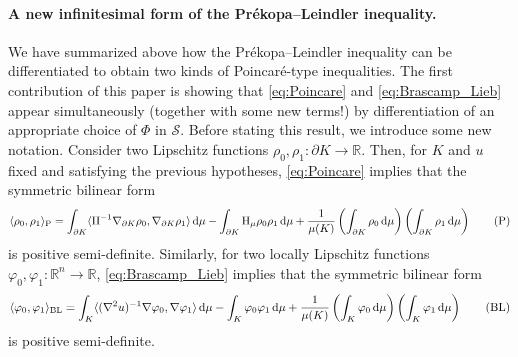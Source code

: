 \documentclass[a4paper, 11pt]{article}
\newcommand{\R}{\mathbb{R}}
\theoremstyle{definition}
\newcommand{\di}{\, \mathrm{d}}
\newcommand{\F}{\mathcal{S}}
\begin{document}
\paragraph{A new infinitesimal form of the Pr\'ekopa--Leindler inequality.} We have summarized above how the Pr\'ekopa--Leindler inequality can be differentiated to obtain two kinds of Poincar\'e-type inequalities. The first contribution of this paper is showing that \eqref{eq:Poincare} and \eqref{eq:Brascamp_Lieb} appear simultaneously (together with some new terms!) by differentiation of an appropriate choice of $\Phi$ in $\F$. Before stating this result, we introduce some new notation. Consider two Lipschitz functions $\rho_0, \rho_1 : \partial K \to \R$. Then, for $K$ and $u$ fixed and satisfying the previous hypotheses, \eqref{eq:Poincare} implies that the symmetric bilinear form 
\begin{equation}\label{eq:P}
     \langle \rho_0,\rho_1 \rangle_{\rm P}= \int_{\partial K} \langle {\rm II}^{-1} \nabla_{\partial K} \rho_0, \nabla_{\partial K} \rho_1 \rangle \di \mu - \int_{\partial K} {\rm H}_\mu \rho_0 \rho_1 \di \mu + \frac{1}{\mu(K)}\left(\int_{\partial K} \rho_0 \di \mu\right)\left(\int_{\partial K} \rho_1 \di \mu\right)
     \tag{P}
\end{equation}
is positive semi-definite. Similarly, for two locally Lipschitz functions $\varphi_0, \varphi_1: \R^n \to \R$, \eqref{eq:Brascamp_Lieb} implies that the symmetric bilinear form 
\begin{equation}\label{eq:BL}
    \langle \varphi_0, \varphi_1 \rangle_{\rm BL}= \int_K \langle (\nabla^2 u)^{-1} \nabla \varphi_0, \nabla \varphi_1\rangle \di \mu - \int_K \varphi_0 \varphi_1 \di \mu + \frac{1}{\mu(K)}\left(\int_K \varphi_0 \di \mu \right)\left( \int_K \varphi_1 \di \mu \right)
    \tag{BL}
\end{equation}
is positive semi-definite. 
\end{document}
